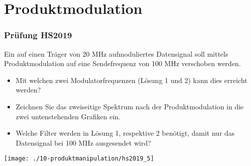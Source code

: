 

\section{Produktmodulation}

\subsubsection{Prüfung HS2019}
Ein auf einen Träger von 20 MHz aufmoduliertes Datensignal soll mittels Produktmodulation auf eine Sendefrequenz von 100 MHz verschoben werden.\\
\begin{itemize}
    \item Mit welchen zwei Modulatorfrequenzen (Lösung 1 und 2) kann dies erreicht werden?
    \item Zeichnen Sie das zweiseitige Spektrum nach der Produktmodulation in die zwei untenstehenden Grafiken ein.
    \item Welche Filter werden in Lösung 1, respektive 2 benötigt, damit nur das Datensignal bei 100 MHz ausgesendet wird?
\end{itemize}

\begin{center}
    \vspace{-8pt}
    \texttt{[image: ./10-produktmanipulation/hs2019\_5]}
    \vspace{-8pt}
\end{center}